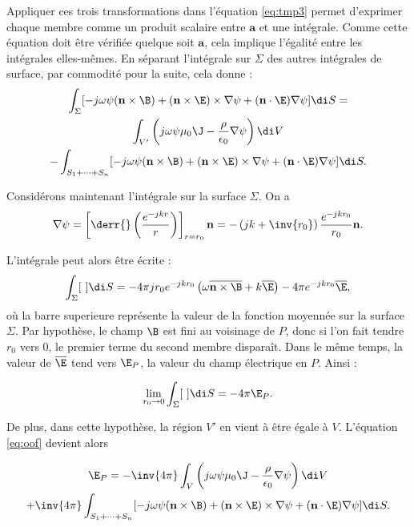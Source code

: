 Appliquer ces trois transformations dans l'équation \eqref{eq:tmp3} permet d'exprimer chaque membre comme un produit scalaire entre $\mathbf{a}$ et une intégrale. Comme cette équation doit être vérifiée quelque soit $\mathbf a$, cela implique l'égalité entre les intégrales elles-mêmes. En séparant l'intégrale sur $\Sigma$ des autres intégrales de surface, par commodité pour la suite, cela donne :
\begin{multline}
	\label{eq:oof}
	\int_\Sigma[-j\omega\psi(\mathbf n\times\B)+(\mathbf n \times \E)\times\nabla\psi+(\mathbf n
	\cdot\E)\nabla\psi]\di S =
	\\ \int_{V'}\left(j\omega\psi\mu_0\J - \frac{\rho}{\epsilon_0}\nabla\psi\right)\di V 
	\\- \int_{S_1+\dots+S_n}[-j\omega\psi(\mathbf n\times\B)+(\mathbf n \times \E)\times\nabla\psi+
	(\mathbf n\cdot\E)\nabla\psi]\di S.
\end{multline}

Considérons maintenant l'intégrale sur la surface $\Sigma$. On a 
\begin{equation}
	\nabla\psi = \left[\derr{}\left(\frac{e^{-jkr}}{r}\right)\right]_{r=r_0}\mathbf n = -\left(jk+
	\inv{r_0}\right)\frac{e^{-jkr_0}}{r_0}\mathbf n.
\end{equation}

L'intégrale peut alors être écrite :
\begin{equation}
	\int_\Sigma[\ ]\di S = -4\pi jr_0e^{-jkr_0}\left(\omega\overline{\mathbf{n}\times \B}+k
	\overline{\E}\right)-4\pi e^{-jkr_0}\overline{\E},
\end{equation}
%
où la barre superieure représente la valeur de la fonction moyennée sur la surface $\Sigma$. Par hypothèse, le champ $\B$ est fini au voisinage de $P$, donc si l'on fait tendre $r_0$ vers 0, le premier terme du second membre disparaît. Dans le même temps, la valeur de $\overline{\E}$ tend vers $\E_P$, la valeur du champ électrique en $P$. Ainsi :

\begin{equation}
	\lim_{r_0\to0}\int_\Sigma[\ ]\di S = -4\pi\E_P.
\end{equation}

De plus, dans cette hypothèse, la région $V'$ en vient à être égale à $V$. L'équation \eqref{eq:oof} devient alors

\begin{multline}
	\label{eq:general_solution}
	\E_P = -\inv{4\pi} \int_{V}\left(j\omega\psi\mu_0\J - \frac{\rho}{\epsilon_0}\nabla\psi\right)
	\di V 
	\\+ \inv{4\pi} \int_{S_1+\dots+S_n}[-j\omega\psi(\mathbf n\times\B)+(\mathbf n \times \E)\times
	\nabla\psi+(\mathbf n\cdot\E)\nabla\psi]\di S.
\end{multline}

